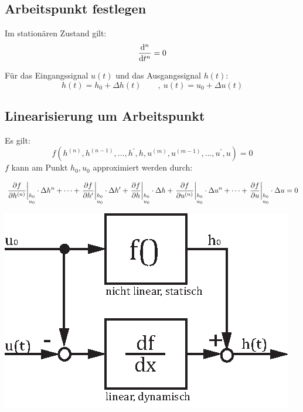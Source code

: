\subsection{Arbeitspunkt festlegen}

Im stationären Zustand gilt:
\[
	\frac{\mathrm{d} ^n}{\mathrm{d} t^n} = 0
\]

Für das Eingangssignal $u(t)$ und das Ausgangssignal $h(t)$:
\[
	h(t) = h_0 + \Delta h(t) \qquad ,\ u(t) = u_0 + \Delta u(t)
\]


\subsection{Linearisierung um Arbeitspunkt}
Es gilt:
\[
	f(h^{(n)}, h^{(n-1)}, \dots ,h^{'} ,h, u^{(m)}, u^{(m-1)}, \dots ,u^{'} ,u)= 0
\]
$f$ kann am Punkt $h_0, u_0$ approximiert werden durch:
\begin{small}
\[
	\left.\pdifrac{f}{h^{(n)}}\right|_{\begin{scriptsize}\begin{matrix} h_0 \\ u_0 \end{matrix}\end{scriptsize}} \cdot \Delta h^{n} + \dots +
	\left.\pdifrac{f}{h'}\right|_{\begin{scriptsize}\begin{matrix} h_0 \\ u_0 \end{matrix}\end{scriptsize}} \cdot \Delta h' +
	\left.\pdifrac{f}{h}\right|_{\begin{scriptsize}\begin{matrix} h_0 \\ u_0 \end{matrix}\end{scriptsize}} \cdot \Delta h +
	\left.\pdifrac{f}{u^{(n)}}\right|_{\begin{scriptsize}\begin{matrix} h_0 \\ u_0 \end{matrix}\end{scriptsize}} \cdot \Delta u^{n} + \dots +
	\left.\pdifrac{f}{u}\right|_{\begin{scriptsize}\begin{matrix} h_0 \\ u_0 \end{matrix}\end{scriptsize}} \cdot \Delta u = 0
\]
\end{small}

\begin{center}
	\includegraphics[scale = 0.8]{images/linearisierung.eps}
\end{center}
